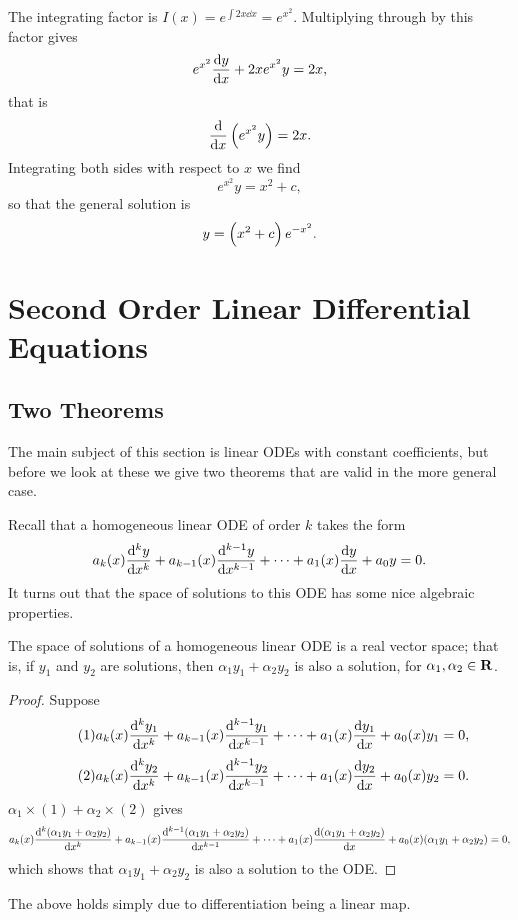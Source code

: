 \begin{solution}
The integrating factor is $I(x)=e^{\int 2x\dd{x}}=e^{x^2}$. Multiplying through by this factor gives
\[e^{x^2}\dv{y}{x}+2xe^{x^2}y=2x,\]
that is
\[\dv{}{x}\left(e^{x^2}y\right)=2x.\]
Integrating both sides with respect to $x$ we find
\[e^{x^2}y=x^2+c,\]
so that the general solution is
\[y=\left(x^2+c\right)e^{-x^2}.\]
\end{solution}

\section{Second Order Linear Differential Equations}
\subsection{Two Theorems}
The main subject of this section is linear ODEs with constant coefficients, but before we look at these we give two theorems that are valid in the more general case.

Recall that a homogeneous linear ODE of order $k$ takes the form
\[a_k(x)\dv[k]{y}{x}+a_{k-1}(x)\dv[k-1]{y}{x}+\cdots+a_1(x)\dv{y}{x}+a_0y=0.\]
It turns out that the space of solutions to this ODE has some nice algebraic properties.

\begin{theorem}
The space of solutions of a homogeneous linear ODE is a real vector space; that is, if $y_1$ and $y_2$ are solutions, then $\alpha_1y_1+\alpha_2y_2$ is also a solution, for $\alpha_1,\alpha_2\in\mathbf R$.
\end{theorem}

\begin{proof}
Suppose
\begin{equation*}\tag{1}
a_k(x)\dv[k]{y_1}{x}+a_{k-1}(x)\dv[k-1]{y_1}{x}+\cdots+a_1(x)\dv{y_1}{x}+a_0(x)y_1=0,
\end{equation*}
\begin{equation*}\tag{2}
a_k(x)\dv[k]{y_2}{x}+a_{k-1}(x)\dv[k-1]{y_2}{x}+\cdots+a_1(x)\dv{y_2}{x}+a_0(x)y_2=0.
\end{equation*}
$\alpha_1\times(1)+\alpha_2\times(2)$ gives
\[a_k(x)\dv[k]{(\alpha_1y_1+\alpha_2y_2)}{x}+a_{k-1}(x)\dv[k-1]{(\alpha_1y_1+\alpha_2y_2)}{x}+\cdots+a_1(x)\dv{(\alpha_1y_1+\alpha_2y_2)}{x}+a_0(x)(\alpha_1y_1+\alpha_2y_2)=0,\]
which shows that $\alpha_1y_1+\alpha_2y_2$ is also a solution to the ODE.
\end{proof}

\begin{remark}
The above holds simply due to differentiation being a linear map.
\end{remark}

